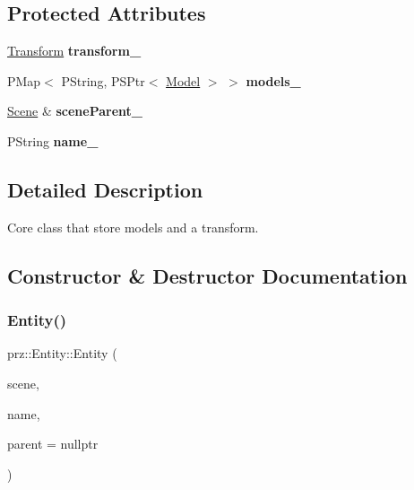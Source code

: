 \subsection*{Protected Attributes}
\begin{DoxyCompactItemize}
\item 
\mbox{\label{classprz_1_1_entity_a86b40fe1cccd095c57aca2ad4ee9c37f}} 
\mbox{\hyperlink{classprz_1_1_transform}{Transform}} {\bfseries transform\+\_\+}
\item 
\mbox{\label{classprz_1_1_entity_a30ff5d8bbb248340a40689dcdea681c7}} 
P\+Map$<$ P\+String, P\+S\+Ptr$<$ \mbox{\hyperlink{classprz_1_1_model}{Model}} $>$ $>$ {\bfseries models\+\_\+}
\item 
\mbox{\label{classprz_1_1_entity_a80ef1d26d5c2d326ffa0117b07cf8c7f}} 
\mbox{\hyperlink{classprz_1_1_scene}{Scene}} \& {\bfseries scene\+Parent\+\_\+}
\item 
\mbox{\label{classprz_1_1_entity_a79f31808667de52879fe747b989b3ce6}} 
P\+String {\bfseries name\+\_\+}
\end{DoxyCompactItemize}


\subsection{Detailed Description}
Core class that store models and a transform. 



\subsection{Constructor \& Destructor Documentation}
\mbox{\label{classprz_1_1_entity_a3a2ee329c4db0ab431c318213c79f5f4}} 
\subsubsection{\texorpdfstring{Entity()}{Entity()}\hspace{0.1cm}{\footnotesize\ttfamily [1/2]}}
{\footnotesize\ttfamily prz\+::\+Entity\+::\+Entity (\begin{DoxyParamCaption}\item[{\mbox{\hyperlink{classprz_1_1_scene}{Scene}} \&}]{scene,  }\item[{const P\+String \&}]{name,  }\item[{\mbox{\hyperlink{classprz_1_1_transform}{Transform}} $\ast$}]{parent = {\ttfamily nullptr} }\end{DoxyParamCaption})\hspace{0.3cm}{\ttfamily [inline]}}



